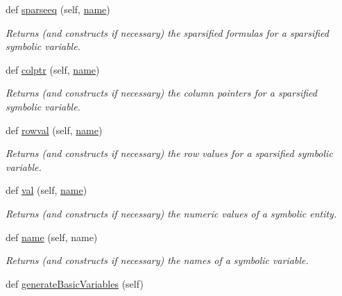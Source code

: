 \begin{DoxyCompactItemize}
def \mbox{\hyperlink{classamici_1_1ode__export_1_1_o_d_e_model_ade69c458d3c7069f0b062d796f68d1da}{sparseeq}} (self, \mbox{\hyperlink{classamici_1_1ode__export_1_1_o_d_e_model_a4d110acf8e52c4d48044071ea06952c0}{name}})
\begin{DoxyCompactList}\small\item\em Returns (and constructs if necessary) the sparsified formulas for a sparsified symbolic variable. \end{DoxyCompactList}\item 
def \mbox{\hyperlink{classamici_1_1ode__export_1_1_o_d_e_model_ad478875583922ae8d579486a03107557}{colptr}} (self, \mbox{\hyperlink{classamici_1_1ode__export_1_1_o_d_e_model_a4d110acf8e52c4d48044071ea06952c0}{name}})
\begin{DoxyCompactList}\small\item\em Returns (and constructs if necessary) the column pointers for a sparsified symbolic variable. \end{DoxyCompactList}\item 
def \mbox{\hyperlink{classamici_1_1ode__export_1_1_o_d_e_model_af1c1cc87fcc84bb17f41ee7fabaf795d}{rowval}} (self, \mbox{\hyperlink{classamici_1_1ode__export_1_1_o_d_e_model_a4d110acf8e52c4d48044071ea06952c0}{name}})
\begin{DoxyCompactList}\small\item\em Returns (and constructs if necessary) the row values for a sparsified symbolic variable. \end{DoxyCompactList}\item 
def \mbox{\hyperlink{classamici_1_1ode__export_1_1_o_d_e_model_a8d081fd7c43cbb2bce7b4eca67fb94c5}{val}} (self, \mbox{\hyperlink{classamici_1_1ode__export_1_1_o_d_e_model_a4d110acf8e52c4d48044071ea06952c0}{name}})
\begin{DoxyCompactList}\small\item\em Returns (and constructs if necessary) the numeric values of a symbolic entity. \end{DoxyCompactList}\item 
def \mbox{\hyperlink{classamici_1_1ode__export_1_1_o_d_e_model_a4d110acf8e52c4d48044071ea06952c0}{name}} (self, name)
\begin{DoxyCompactList}\small\item\em Returns (and constructs if necessary) the names of a symbolic variable. \end{DoxyCompactList}\item 
def \mbox{\hyperlink{classamici_1_1ode__export_1_1_o_d_e_model_af3b774d51a546704413dc57f93dc427d}{generate\+Basic\+Variables}} (self)

\end{DoxyCompactItemize}
